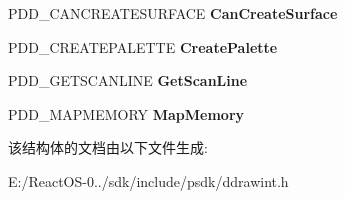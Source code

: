 \begin{DoxyCompactItemize}
P\+D\+D\+\_\+\+C\+A\+N\+C\+R\+E\+A\+T\+E\+S\+U\+R\+F\+A\+CE {\bfseries Can\+Create\+Surface}
\item 
\mbox{\label{struct_d_d___c_a_l_l_b_a_c_k_s_a37bb65d32cd61cc03e25b43ae19fe1e5}} 
P\+D\+D\+\_\+\+C\+R\+E\+A\+T\+E\+P\+A\+L\+E\+T\+TE {\bfseries Create\+Palette}
\item 
\mbox{\label{struct_d_d___c_a_l_l_b_a_c_k_s_a6e91c1c04e35ac124c0c2d8035dc90c1}} 
P\+D\+D\+\_\+\+G\+E\+T\+S\+C\+A\+N\+L\+I\+NE {\bfseries Get\+Scan\+Line}
\item 
\mbox{\label{struct_d_d___c_a_l_l_b_a_c_k_s_ae966040543ef93625ae058e1736eb946}} 
P\+D\+D\+\_\+\+M\+A\+P\+M\+E\+M\+O\+RY {\bfseries Map\+Memory}
\end{DoxyCompactItemize}


该结构体的文档由以下文件生成\+:\begin{DoxyCompactItemize}
\item 
E\+:/\+React\+O\+S-\/0../sdk/include/psdk/ddrawint.\+h\end{DoxyCompactItemize}

